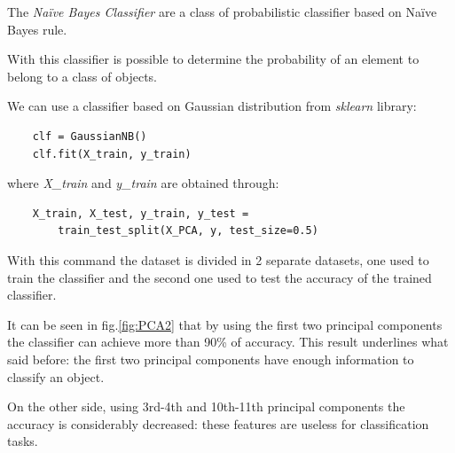 \documentclass[10pt,a4paper]{article}
\begin{document}
	The \emph{Na\"ive Bayes Classifier} are a class of probabilistic classifier based on Na\"ive Bayes rule.
	
	With this classifier is possible to determine the probability of an element to belong to a class of objects.
	
	We can use a classifier based on Gaussian distribution from \emph{sklearn} library:
	
	\begin{Verbatim}
	clf = GaussianNB()
	clf.fit(X_train, y_train)
	\end{Verbatim}
	
	where \emph{X\_train} and \emph{y\_train} are obtained through:
	
	\begin{Verbatim}
	X_train, X_test, y_train, y_test = 
		train_test_split(X_PCA, y, test_size=0.5)
	\end{Verbatim}
	
	With this command the dataset is divided in 2 separate datasets, one used to train the classifier and the second one used to test the accuracy of the trained classifier.	
	
	It can be seen in fig.\ref{fig:PCA2} that by using the first two principal components the classifier can achieve more than 90\% of accuracy. This result underlines what said before: the first two principal components have enough information to classify an object. 
	
	On the other side, using 3rd-4th and 10th-11th principal components the accuracy is considerably decreased: these features are useless for classification tasks.
 	
\end{document}
